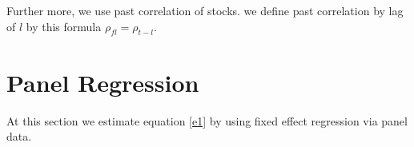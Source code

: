 \documentclass[12pt]{article}
\begin{document}
Further more, we use past correlation of stocks. we define past correlation by lag of $ l $ by this formula $ \rho_{fl} =  \rho_{t-l} $.





\begin{landscape}
\begin{table}
\centering

\end{table}

\end{landscape}
\restoregeometry


\begin{table}
\centering

\end{table}



\FloatBarrier
\section{Panel Regression}
At this section we estimate equation \ref{e1} by using fixed effect regression via panel data.
\end{document}
